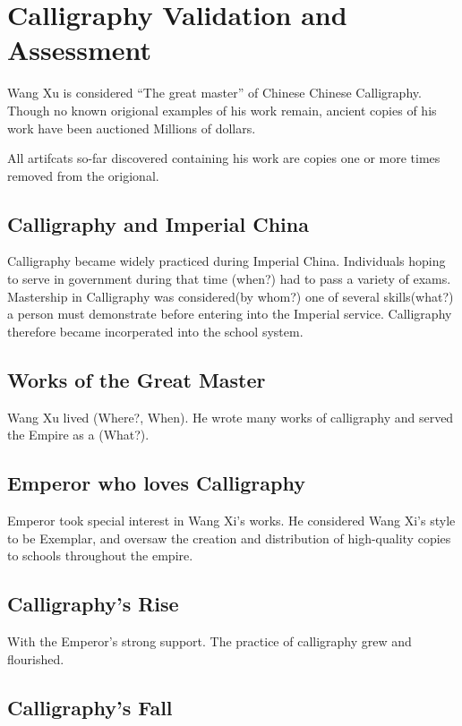 \chapter{Calligraphy Validation and Assessment}

Wang Xu is considered ``The great master'' of Chinese Chinese Calligraphy.  Though no known origional examples of his work remain, ancient copies of his work have been auctioned Millions of dollars.

All artifcats so-far discovered containing his work are copies one or more times removed from the origional.

\section{Calligraphy and Imperial China}

Calligraphy became widely practiced during Imperial China.  Individuals hoping to serve in government during that time (when?) had to pass a variety of exams.  Mastership in Calligraphy was considered(by whom?) one of several skills(what?) a person must demonstrate before entering into the Imperial service.  Calligraphy therefore became incorperated into the school system. 

\section{Works of the Great Master}

Wang Xu lived (Where?, When).  He wrote many works of calligraphy and served the Empire as a (What?).  

\section{Emperor who loves Calligraphy}

Emperor took special interest in Wang Xi's works.  He considered Wang Xi's style to be Exemplar, and oversaw the creation and distribution of high-quality copies to schools throughout the empire.

\section{Calligraphy's Rise}

With the Emperor's strong support. The practice of calligraphy grew and flourished.

\section{Calligraphy's Fall}

